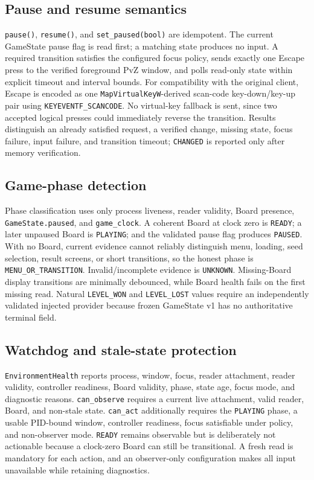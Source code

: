 \documentclass[11pt,a4paper]{article}
\begin{document}
\subsection{Pause and resume semantics}
\texttt{pause()}, \texttt{resume()}, and \texttt{set\_paused(bool)} are idempotent. The current GameState pause flag is read first; a matching state produces no input. A required transition satisfies the configured focus policy, sends exactly one Escape press to the verified foreground PvZ window, and polls read-only state within explicit timeout and interval bounds. For compatibility with the original client, Escape is encoded as one \texttt{MapVirtualKeyW}-derived scan-code key-down/key-up pair using \texttt{KEYEVENTF\_SCANCODE}. No virtual-key fallback is sent, since two accepted logical presses could immediately reverse the transition. Results distinguish an already satisfied request, a verified change, missing state, focus failure, input failure, and transition timeout; \texttt{CHANGED} is reported only after memory verification.

\subsection{Game-phase detection}
Phase classification uses only process liveness, reader validity, Board presence, \texttt{GameState.paused}, and \texttt{game\_clock}. A coherent Board at clock zero is \texttt{READY}; a later unpaused Board is \texttt{PLAYING}; and the validated pause flag produces \texttt{PAUSED}. With no Board, current evidence cannot reliably distinguish menu, loading, seed selection, result screens, or short transitions, so the honest phase is \texttt{MENU\_OR\_TRANSITION}. Invalid/incomplete evidence is \texttt{UNKNOWN}. Missing-Board display transitions are minimally debounced, while Board health fails on the first missing read. Natural \texttt{LEVEL\_WON} and \texttt{LEVEL\_LOST} values require an independently validated injected provider because frozen GameState v1 has no authoritative terminal field.

\subsection{Watchdog and stale-state protection}
\texttt{EnvironmentHealth} reports process, window, focus, reader attachment, reader validity, controller readiness, Board validity, phase, state age, focus mode, and diagnostic reasons. \texttt{can\_observe} requires a current live attachment, valid reader, Board, and non-stale state. \texttt{can\_act} additionally requires the \texttt{PLAYING} phase, a usable PID-bound window, controller readiness, focus satisfiable under policy, and non-observer mode. \texttt{READY} remains observable but is deliberately not actionable because a clock-zero Board can still be transitional. A fresh read is mandatory for each action, and an observer-only configuration makes all input unavailable while retaining diagnostics.
\end{document}
